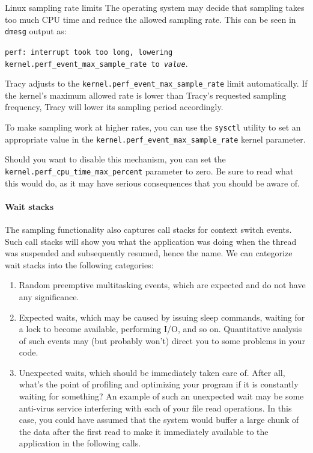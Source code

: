\documentclass[hidelinks,titlepage,a4paper,twoside]{article}
\begin{document}
\begin{bclogo}[
noborder=true,
couleur=black!5,
logo=\bcbombe
]{Linux sampling rate limits}
The operating system may decide that sampling takes too much CPU time and reduce the allowed sampling rate. This can be seen in \texttt{dmesg} output as:

\vspace{0.25em}

\texttt{perf: interrupt took too long, lowering kernel.perf\_event\_max\_sample\_rate to \emph{value}}.

\vspace{0.25em}

Tracy adjusts to the \texttt{kernel.perf\_event\_max\_sample\_rate} limit automatically. If the kernel's maximum allowed rate is lower than Tracy's requested sampling frequency, Tracy will lower its sampling period accordingly.

To make sampling work at higher rates, you can use the \texttt{sysctl} utility to set an appropriate value in the \texttt{kernel.perf\_event\_max\_sample\_rate} kernel parameter.

Should you want to disable this mechanism, you can set the \texttt{kernel.perf\_cpu\_time\_max\_percent} parameter to zero. Be sure to read what this would do, as it may have serious consequences that you should be aware of.
\end{bclogo}

\paragraph{Wait stacks}
\label{waitstacks}

The sampling functionality also captures call stacks for context switch events. Such call stacks will show you what the application was doing when the thread was suspended and subsequently resumed, hence the name. We can categorize wait stacks into the following categories:

\begin{enumerate}
\item Random preemptive multitasking events, which are expected and do not have any significance.
\item Expected waits, which may be caused by issuing sleep commands, waiting for a lock to become available, performing I/O, and so on. Quantitative analysis of such events may (but probably won't) direct you to some problems in your code.
\item Unexpected waits, which should be immediately taken care of. After all, what's the point of profiling and optimizing your program if it is constantly waiting for something? An example of such an unexpected wait may be some anti-virus service interfering with each of your file read operations. In this case, you could have assumed that the system would buffer a large chunk of the data after the first read to make it immediately available to the application in the following calls.
\end{enumerate}
\end{document}
